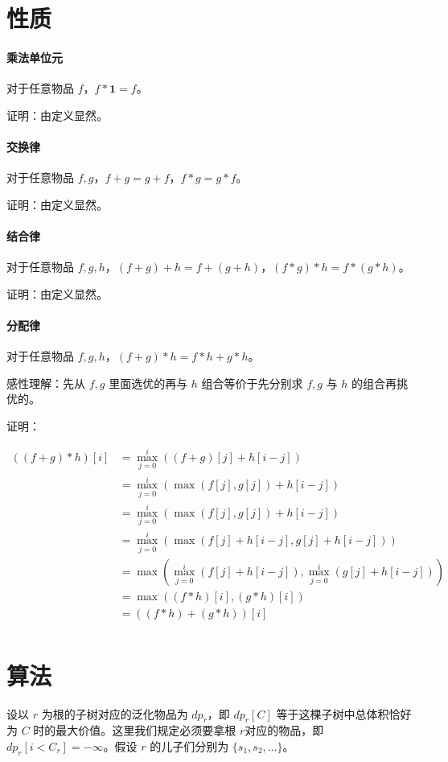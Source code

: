 \documentclass{article}
\begin{document}
\section{性质}

\paragraph{乘法单位元}
对于任意物品 $f$，$f * \textbf{1} = f$。

证明：由定义显然。
\paragraph{交换律}
对于任意物品 $f,g$，$f+g = g+f$，$f*g = g*f$。

证明：由定义显然。
\paragraph{结合律}
对于任意物品 $f,g,h$，$(f+g)+h = f+(g+h)$，$(f*g)*h = f*(g*h)$。

证明：由定义显然。

\paragraph{分配律}
对于任意物品 $f,g,h$，$(f+g)*h = f*h + g*h$。

感性理解：先从 $f,g$ 里面选优的再与 $h$ 组合等价于先分别求 $f,g$ 与 $h$ 的组合再挑优的。

证明：

\begin{align*}
    ((f+g)*h)[i] 
    &= \max_{j = 0}^i ((f+g)[j] + h[i-j])\\
    &= \max_{j = 0}^i (\max(f[j],g[j]) + h[i-j])\\
    &= \max_{j = 0}^i (\max(f[j],g[j]) + h[i-j])\\
    &= \max_{j = 0}^i (\max(f[j]+h[i-j],g[j]+h[i-j]))\\
    &= \max(\max_{j = 0}^i(f[j]+h[i-j]),\max_{j = 0}^i(g[j]+h[i-j]))\\
    &= \max((f*h)[i],(g*h)[i])\\
    &= ((f*h)+(g*h))[i]\\
\end{align*}

\section{算法}

设以 $r$ 为根的子树对应的泛化物品为 $dp_r$，即 $dp_r[C]$ 等于这棵子树中总体积恰好为 $C$ 时的最大价值。这里我们规定必须要拿根 $r$对应的物品，即 $dp_r[i<C_r] = -\infty$。假设 $r$ 的儿子们分别为 $\{s_1,s_2,\ldots \}$。
\end{document}
